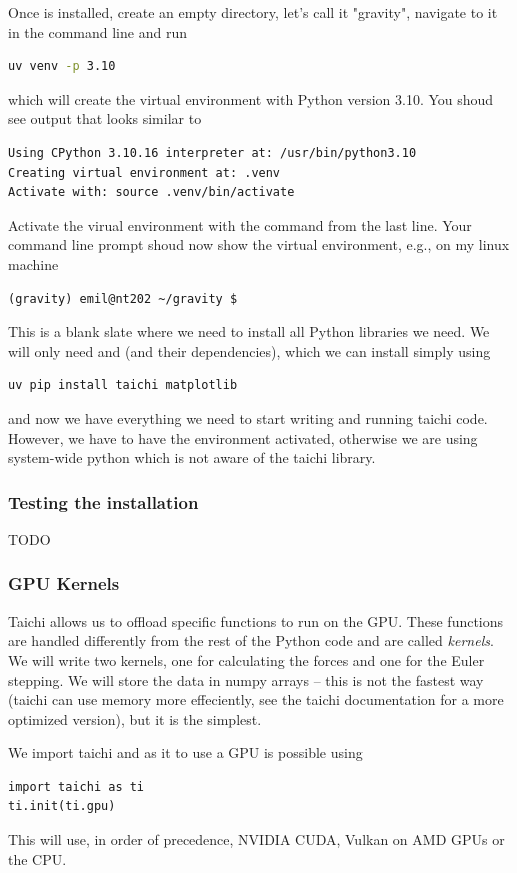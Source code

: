 Once  is installed, create an empty directory, let's call it "gravity", navigate to it in the command line and run
\begin{lstlisting}[language=bash]
uv venv -p 3.10
\end{lstlisting}
which will create the virtual environment with Python version 3.10. You shoud see output that looks similar to
\begin{verbatim}
Using CPython 3.10.16 interpreter at: /usr/bin/python3.10
Creating virtual environment at: .venv
Activate with: source .venv/bin/activate
\end{verbatim}
Activate the virual environment with the command from the last line. Your command line prompt shoud now show the virtual environment, e.g., on my linux machine
\begin{verbatim}
(gravity) emil@nt202 ~/gravity $
\end{verbatim}
This is a blank slate where we need to install all Python libraries we need. We will only need  and  (and their dependencies), which we can install simply using
\begin{lstlisting}
uv pip install taichi matplotlib
\end{lstlisting}
and now we have everything we need to start writing and running taichi code. However, we have to have the environment activated, otherwise we are using system-wide python which is not aware of the taichi library.

\subsubsection{Testing the installation}
TODO

\subsubsection{GPU Kernels}
Taichi allows us to offload specific functions to run on the GPU. These functions are handled differently from the rest of the Python code and are called \emph{kernels}. We will write two kernels, one for calculating the forces and one for the Euler stepping. We will store the data in numpy arrays -- this is not the fastest way (taichi can use memory more effeciently, see the taichi documentation for a more optimized version), but it is the simplest.

We import taichi and as it to use a GPU is possible using
\begin{lstlisting}
import taichi as ti
ti.init(ti.gpu)
\end{lstlisting}
This will use, in order of precedence, NVIDIA CUDA, Vulkan on AMD GPUs or the CPU.

